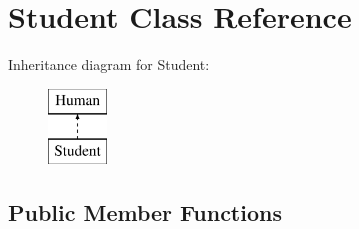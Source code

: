 \hypertarget{class_student}{}\section{Student Class Reference}
\label{class_student}
Inheritance diagram for Student\+:\begin{figure}[H]
\begin{center}
\leavevmode
\includegraphics[height=2.000000cm]{class_student}
\end{center}
\end{figure}
\subsection*{Public Member Functions}
